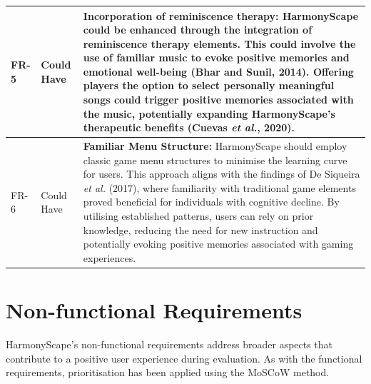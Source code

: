 \documentclass{l4proj}
\begin{document}
\begin{longtable}{|p{1.5cm}|p{1.5cm}|p{10cm}|}
\hline
FR-5 & Could Have & \textbf{Incorporation of reminiscence therapy:} HarmonyScape could be enhanced through the integration of reminiscence therapy elements. This could involve the use of familiar music to evoke positive memories and emotional well-being (Bhar and Sunil, 2014). Offering players the option to select personally meaningful songs could trigger positive memories associated with the music, potentially expanding HarmonyScape's therapeutic benefits (Cuevas \emph{et al.}, 2020). \\ 
\hline
FR-6 & Could Have & \textbf{Familiar Menu Structure:} HarmonyScape should employ classic game menu structures to minimise the learning curve for users. This approach aligns with the findings of De Siqueira \emph{et al.} (2017), where familiarity with traditional game elements proved beneficial for individuals with cognitive decline. By utilising established patterns, users can rely on prior knowledge, reducing the need for new instruction and potentially evoking positive memories associated with gaming experiences. \\
\end{longtable}

\section{Non-functional Requirements}
HarmonyScape's non-functional requirements address broader aspects that contribute to a positive user experience during evaluation. As with the functional requirements, prioritisation has been applied using the MoSCoW method.
\end{document}
